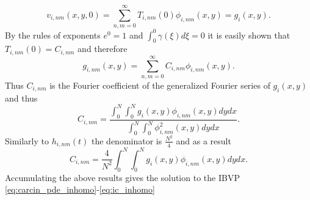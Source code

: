 \documentclass[\main/thesis.tex]{subfiles}
\begin{document}
\begin{equation*}
v_{i, nm}(x, y, 0) {=} \sum_{n,m{=}0}^{\infty} T_{i,nm}(0)\phi_{i,nm}(x, y) {=} g_i(x, y).
\end{equation*}
By the rules of exponents $e^0 {=} 1$ and $\int_{0}^{0} \gamma(\xi) d\xi {=} 0$ it is easily shown that \newline
$T_{i,nm}(0) {=} C_{i,nm}$ and therefore
\begin{equation*}
g_{i,nm}(x, y) {=} \sum_{n,m{=}0}^{\infty} C_{i,nm} \phi_{i,nm}(x, y).
\end{equation*}
Thus $C_{i,nm}$ is the Fourier coefficient of the generalized Fourier series of $g_i(x, y)$ and thus
\begin{equation*}
C_{i,nm} {=} \frac{\int_{0}^{N} \int_{0}^{N} g_i(x, y) \phi_{i,nm}(x, y) dy dx}{\int_{0}^{N} \int_{0}^{N} \phi_{i,nm}^2(x, y) dy dx}.
\end{equation*}
Similarly to $h_{i,nm}(t)$ the denominator is $\frac{N^2}{4}$ and as a result
\begin{equation}
C_{i,nm} {=} \frac{4}{N^2} \int_{0}^{N} \int_{0}^{N} g_i(x, y) \phi_{i,nm}(x, y) dy dx.
\label{eq:fourier_coeff_g}
\end{equation}
Accumulating the above results gives the solution to the IBVP \eqref{eq:carcin_pde_inhomo}-\eqref{eq:ic_inhomo}  
\end{document}
